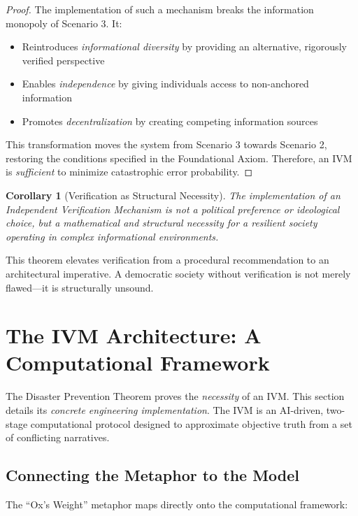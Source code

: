 \documentclass[11pt,a4paper]{article}
\newtheorem{corollary}{Corollary}[theorem]
\begin{document}
\begin{proof}
The implementation of such a mechanism breaks the information monopoly of Scenario 3. It:
\begin{itemize}
    \item Reintroduces \textit{informational diversity} by providing an alternative, rigorously verified perspective
    \item Enables \textit{independence} by giving individuals access to non-anchored information
    \item Promotes \textit{decentralization} by creating competing information sources
\end{itemize}

This transformation moves the system from Scenario 3 towards Scenario 2, restoring the conditions specified in the Foundational Axiom. Therefore, an IVM is \textit{sufficient} to minimize catastrophic error probability.
\end{proof}

\begin{corollary}[Verification as Structural Necessity]
The implementation of an Independent Verification Mechanism is not a political preference or ideological choice, but a mathematical and structural necessity for a resilient society operating in complex informational environments.
\end{corollary}

This theorem elevates verification from a procedural recommendation to an architectural imperative. A democratic society without verification is not merely flawed---it is structurally unsound.

\section{The IVM Architecture: A Computational Framework}

The Disaster Prevention Theorem proves the \textit{necessity} of an IVM. This section details its \textit{concrete engineering implementation}. The IVM is an AI-driven, two-stage computational protocol designed to approximate objective truth from a set of conflicting narratives.

\subsection{Connecting the Metaphor to the Model}

The ``Ox's Weight'' metaphor maps directly onto the computational framework:
\end{document}
